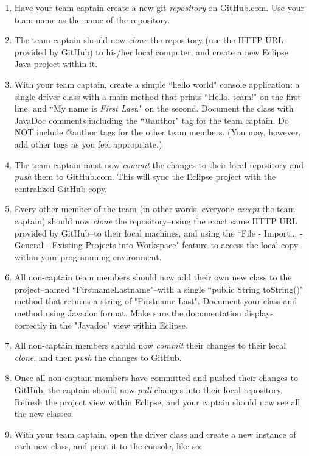\documentclass{article}
\begin{document}
\begin{enumerate}
	\item Have your team captain create a new git {\it repository} on GitHub.com. Use your team name as the name of the repository.
	\item The team captain should now {\it clone} the repository (use the HTTP URL provided by GitHub) to his/her local computer, and create a new Eclipse Java project within it.
	\item With your team captain, create a simple ``hello world" console application: a single driver class with a main method that prints ``Hello, team!" on the first line, and ``My name is {\it First Last}." on the second. Document the class with JavaDoc comments including the ``@author" tag for the team captain. Do NOT include @author tags for the other team members. (You may, however, add other tags as you feel appropriate.)
	\item The team captain must now {\it commit} the changes to their local repository and {\it push} them to GitHub.com. This will sync the Eclipse project with the centralized GitHub copy.
	\item Every other member of the team (in other words, everyone {\it except} the team captain) should now {\it clone} the repository--using the exact same HTTP URL provided by GitHub--to their local machines, and using the ``File - Import... - General - Existing Projects into Workspace" feature to access the local copy within your programming environment.
	\item All non-captain team members should now add their own new class to the project--named ``FirstnameLastname"--with a single ``public String toString()" method that returns a string of "Firstname Last". Document your class and method using Javadoc format. Make sure the documentation displays correctly in the "Javadoc" view within Eclipse.
	\item All non-captain members should now {\it commit} their changes to their local {\it clone}, and then {\it push} the changes to GitHub.\footnotemark{}
	\item Once all non-captain members have committed and pushed their changes to GitHub, the captain should now {\it pull} changes into their local repository. Refresh the project view within Eclipse, and your captain should now see all the new classes!
	\item With your team captain, open the driver class and create a new instance of each new class, and print it to the console, like so: 

\end{enumerate}
\end{document}
